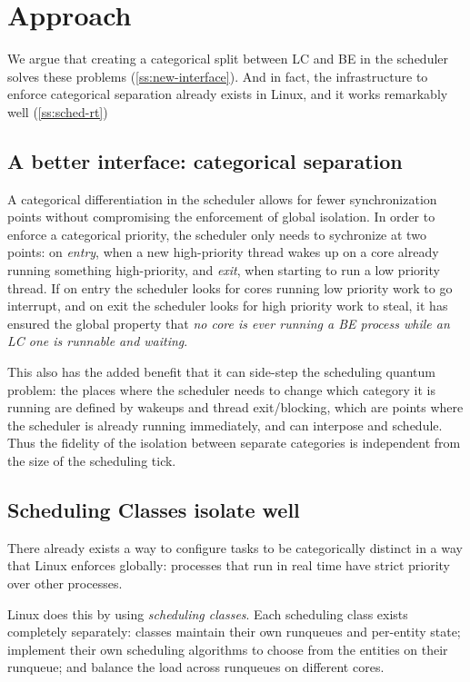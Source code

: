 \section{Approach}\label{s:approach}

We argue that creating a categorical split between LC and BE in the scheduler
solves these problems (\autoref{ss:new-interface}). And in fact, the
infrastructure to enforce categorical separation already exists in Linux, and it
works remarkably well (\autoref{ss:sched-rt})

\subsection{A better interface: categorical separation}\label{ss:new-interface}

A categorical differentiation in the scheduler allows for fewer synchronization
points without compromising the enforcement of global isolation. In order to
enforce a categorical priority, the scheduler only needs to sychronize at two
points: on \textit{entry}, when a new high-priority thread wakes up on a core
already running something high-priority, and \textit{exit}, when starting to run
a low priority thread. If on entry the scheduler looks for cores running low
priority work to go interrupt, and on exit the scheduler looks for high priority
work to steal, it has ensured the global property that \textit{no core is ever
running a BE process while an LC one is runnable and waiting}.

This also has the added benefit that it can side-step the scheduling quantum
problem: the places where the scheduler needs to change which category it is
running are defined by wakeups and thread exit/blocking, which are points where
the scheduler is already running immediately, and can interpose and schedule.
Thus the fidelity of the isolation between separate categories is independent
from the size of the scheduling tick.


\subsection{Scheduling Classes isolate well}\label{ss:sched-rt}

There already exists a way to configure tasks to be categorically distinct in a
way that Linux enforces globally: processes that run in real time have strict
priority over other processes.

Linux does this by using \textit{scheduling classes}. Each scheduling class
exists completely separately: classes maintain their own runqueues and
per-entity state; implement their own scheduling algorithms to choose from the
entities on their runqueue; and balance the load across runqueues on different
cores.

